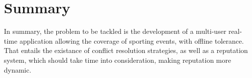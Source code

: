 \section{Summary}

In summary, the problem to be tackled is the development of a multi-user real-time application allowing the coverage of sporting events, with offline tolerance. That entails the existance of conflict resolution strategies, as well as a reputation system, which should take time into consideration, making reputation more dynamic.

